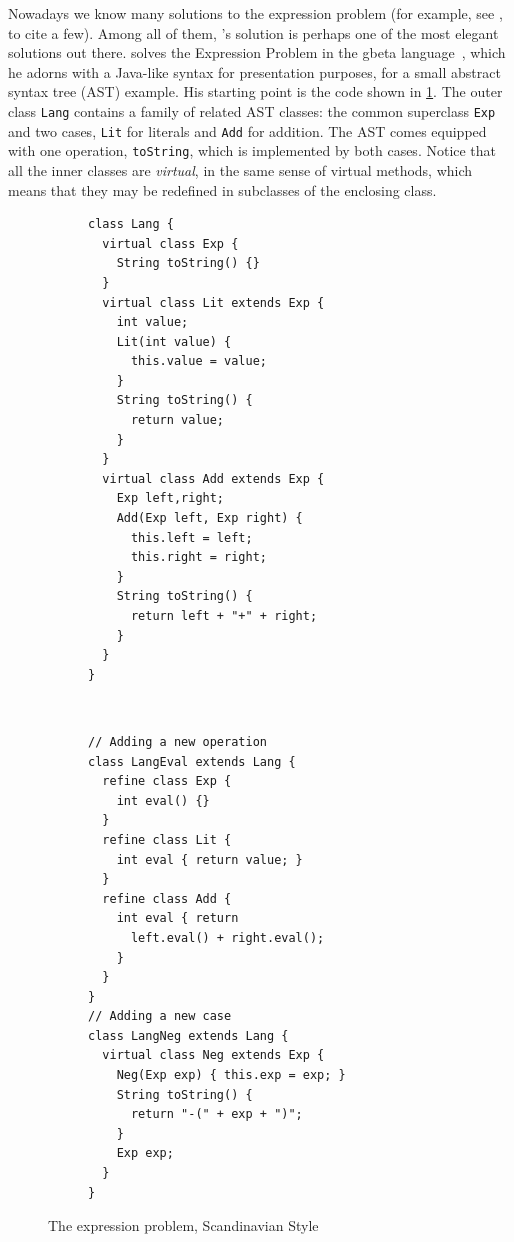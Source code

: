 Nowadays we know many solutions to the expression problem (for example, see
\citet{oliveira2012extensibility, wang2016expression, oliveira09modular,
  swierstra_2008, Zenger-Odersky2005}, to cite a few). Among all of them,
\citeauthor{ernst2004expression}'s solution is perhaps one of the most elegant
solutions out there. \citeauthor{ernst2004expression} solves the Expression
Problem in the \textsf{gbeta} language~\citep{ernst2000gbeta}, which he adorns with a Java-like syntax for
presentation purposes, for a small abstract syntax tree (AST) example. His
starting point is the code shown in \cref{fig:lang}. The outer class
\lstinline{Lang} contains a family of related AST classes: the common superclass
\lstinline{Exp} and two cases, \lstinline{Lit} for literals and \lstinline{Add}
for addition. The AST comes equipped with one operation, \lstinline{toString},
which is implemented by both cases. Notice that all the inner classes are
\emph{virtual}, in the same sense of virtual methods, which means that they
may be redefined in subclasses of the enclosing class.


\begin{figure}[t]
    \centering
    \begin{subfigure}[b]{0.45\textwidth}
\begin{lstlisting}[language=gbeta]
class Lang {
  virtual class Exp {
    String toString() {}
  }
  virtual class Lit extends Exp {
    int value;
    Lit(int value) {
      this.value = value;
    }
    String toString() {
      return value;
    }
  }
  virtual class Add extends Exp {
    Exp left,right;
    Add(Exp left, Exp right) {
      this.left = left;
      this.right = right;
    }
    String toString() {
      return left + "+" + right;
    }
  }
}
\end{lstlisting}
 \label{fig:lang}
    \end{subfigure} ~
    \begin{subfigure}[b]{0.5\textwidth}
\begin{lstlisting}[language=gbeta,  xleftmargin=1mm]
// Adding a new operation
class LangEval extends Lang {
  refine class Exp {
    int eval() {}
  }
  refine class Lit {
    int eval { return value; }
  }
  refine class Add {
    int eval { return
      left.eval() + right.eval();
    }
  }
}
// Adding a new case
class LangNeg extends Lang {
  virtual class Neg extends Exp {
    Neg(Exp exp) { this.exp = exp; }
    String toString() {
      return "-(" + exp + ")";
    }
    Exp exp;
  }
}
\end{lstlisting}
 \label{fig:extend}
    \end{subfigure}
    \caption{The expression problem, Scandinavian Style}
\end{figure}

